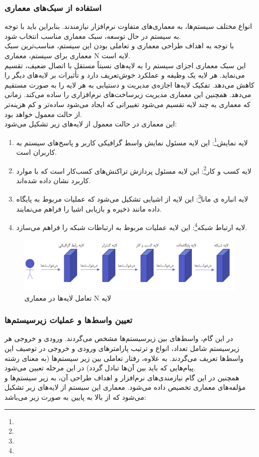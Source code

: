 \documentclass[12pt]{article}
\begin{document}
	\subsubsection{استفاده از سبک‌های معماری}
	انواع مختلف سیستم‌ها، به معماری‌های متفاوت نرم‌افزار نیازمندند. بنابراین باید با توجه به سیستم در حال توسعه، سبک معماری مناسب انتخاب شود.\\
	با توجه به اهداف طراحی معماری و تعاملی بودن این سیستم، مناسب‌ترین سبک معماری برای سیستم، معماری N لایه است.\\
	این سبک معماری اجزای سیستم را به لایه‌های نسبتاً مستقل با اتصال ضعیف، تقسیم می‌نماید. هر لایه یک وظیفه و عملکرد خوش‌تعریف دارد و تأثیرات بر لایه‌های دیگر را کاهش می‌دهد. تفکیک لایه‌ها اجازه‌ی مدیریت و دستیابی به هر لایه را به صورت مستقیم می‌دهد. همچنین این معماری مدیریت زیرساخت‌های نرم‌افزاری را ساده می‌کند. زمانی که معماری به چند لایه تقسیم می‌شود تغییراتی که ایجاد می‌شود ساده‌تر و کم هزینه‌تر از حالت معمول خواهد بود.\\
	این معماری در حالت معمول از لایه‌های زیر تشکیل می‌شود:
	\begin{enumerate}
		\item لایه نمایش\footnote{}:
		این لایه مسئول نمایش واسط گرافیکی کاربر و پاسخ‌های سیستم به کاربران است.
		\item لایه کسب و کار\footnote{}:
		این لایه مسئول پردازش تراکنش‌های کسب‌کار است که با موارد کاربرد نشان داده شده‌اند.
		\item لایه انباره ی مانا\footnote{}:
		این لایه از اشیایی تشکیل می‌شود که عملیات مربوط به پایگاه داده مانند ذخیره و بازیابی اشیا را فراهم می‌نمایند.
		\item لایه ارتباط شبکه\footnote{}:
		این لایه عملیات مربوط به ارتباطات شبکه را فراهم می‌سازد.
	\end{enumerate}
	\begin{figure}[H]
		\centering
		\includegraphics[width=0.9\linewidth]{files/2}
		\caption{تعامل لایه‌ها در معماری N لایه}
		\label{fig:2}
	\end{figure}

	\subsubsection{تعیین واسط‌ها و عملیات زیرسیستم‌ها}
	در این گام، واسط‌های بین زیرسیستم‌ها مشخص می‌گردند. ورودی و خروجی هر زیرسیستم شامل تعداد، انواع و ترتیب پارامترهای ورودی و خروجی در توصیف این واسط‌ها تعریف می‌گردند. به علاوه، رفتار تعاملی بین زیر سیستم‌ها (به معنای رشته پیام‌هایی که باید بین آن‌ها تبادل گردد) در این مرحله تعیین می‌شود.\\
	همچنین در این گام نیازمندی‌های نرم‌افزار و اهداف طراحی آن، به زیر سیستم‌ها و مؤلفه‌های معماری تخصیص داده می‌شود.
	معماری این سیستم از لایه‌های زیر تشکیل می‌شود که از بالا به پایین به صورت زیر می‌باشد:
\end{document}
